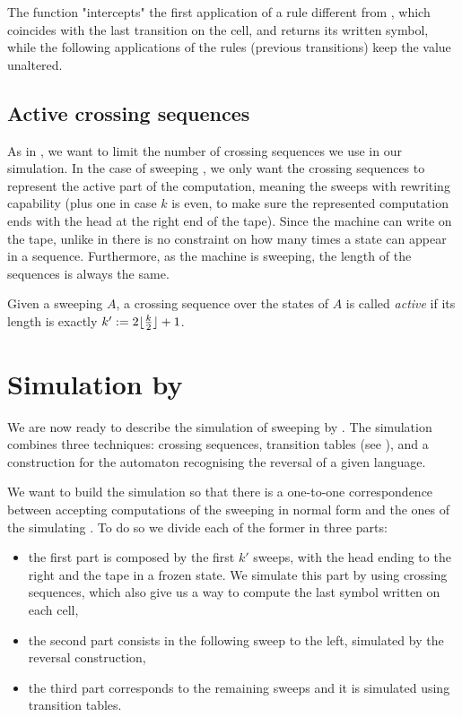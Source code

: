 The function "intercepts" the first application of a rule different from , which coincides with the last transition on the cell, and returns its written symbol, while the following applications of the rules (previous transitions) keep the value unaltered.


\subsection{Active crossing sequences}
As in \TDFAs, we want to limit the number of crossing sequences we use in our simulation.
In the case of sweeping \kDLAs, we only want the crossing sequences to represent the active part of the computation, meaning the sweeps with rewriting capability (plus one in case $k$ is even, to make sure the represented computation ends with the head at the right end of the tape).
Since the machine can write on the tape, unlike in \TDFAs there is no constraint on how many times a state can appear in a sequence. Furthermore, as the machine is sweeping, the length of the sequences is always the same.
\begin{defn}
	Given a sweeping \kLA $A$, a crossing sequence over the states of $A$ is called \emph{active} if its length is exactly $k':=2\lfloor \frac{k}{2} \rfloor+1$.
\end{defn}



\section{Simulation by \NFA}\label{sec:swkdla-to-NFA}
We are now ready to describe the simulation of sweeping \kDLAs by \ONFAs.
The simulation combines three techniques: crossing sequences, transition tables (see ), and a construction for the automaton recognising the reversal of a given language.

We want to build the simulation so that there is a one-to-one correspondence between accepting computations of the sweeping \kDLA in normal form and the ones of the simulating \NFA.
To do so we divide each of the former in three parts:
\begin{itemize}
	\item the first part is composed by the first $k'$ sweeps, with the head ending to the right and the tape in a frozen state. We simulate this part by using crossing sequences, which also give us a way to compute the last symbol written on each cell,
	\item the second part consists in the following sweep to the left, simulated by the reversal construction,
	\item the third part corresponds to the remaining sweeps and it is simulated using transition tables.
\end{itemize}

